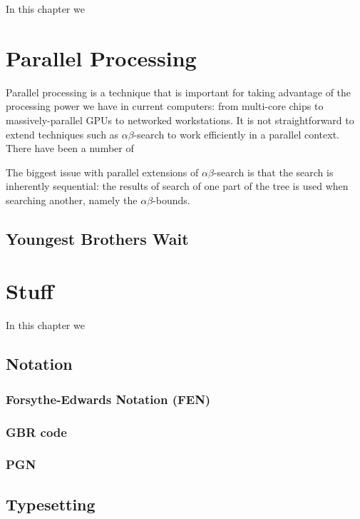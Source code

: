 \documentclass[10pt,dvipdfmx,letterpaper]{report}
\newcommand{\ab}{{$\alpha\beta$}}
\begin{document}
In this chapter we 

\chapter{Parallel Processing}
\label{chap-parallel}

Parallel processing is a technique that is important for taking advantage of the processing
power we have in current computers: from multi-core chips to massively-parallel GPUs to
networked workstations.  It is not straightforward to extend techniques such as \ab-search
to work efficiently in a parallel context.  There have been a number of

The biggest issue with parallel extensions of \ab-search is that the search is inherently
sequential: the results of search of one part of the tree is used when searching another, namely
the \ab-bounds.

\section{Youngest Brothers Wait}

\chapter{Stuff}
\label{chap-stuff}

In this chapter we 

\section{Notation}

\subsection{Forsythe-Edwards Notation (FEN)}
\subsection{GBR code}
\subsection{PGN}

\section{Typesetting}
\end{document}
